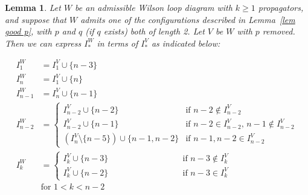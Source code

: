 \documentclass[11pt]{article}
\newtheorem{lem}[thm]{Lemma}
\theoremstyle{remark}
\theoremstyle{definition}
\begin{document}
\begin{lem}\label{lem I}
Let $W$ be an admissible Wilson loop diagram with $k\geq 1$ propagators, and suppose that $W$ admits one of the configurations described in Lemma~\ref{lem good p}, with $p$ and $q$ (if $q$ exists) both of length 2. Let $V$ be $W$ with $p$ removed.  Then we can express $I_*^W$ in terms of $I_*^V$ as indicated below:

  \begin{align*}
    I_1^{W} & = I_1^{V} \cup \{n-3\} \\
    I_n^{W} & = I_1^{V} \cup \{n\} \\
    I_{n-1}^{W} & = I_n^{V} \cup \{n-1\} \\
    I_{n-2}^{W} & =
    \begin{cases}
      I_{n-2}^{V}\cup \{n-2\} & \text{if $n-2\not\in I_{n-2}^{V}$} \\
      I_{n-2}^{V}\cup \{n-1\} & \text{if $n-2\in I_{n-2}^{V}$, $n-1\not\in I_{n-2}^{V}$} \\
      (I_{n}^{V} \setminus \{n-5\})\cup \{n-1,n-2\} & \text{if $n-1, n-2\in I_{n-2}^{V}$}
    \end{cases} \\
    I_{k}^{W} & =
    \begin{cases}
      I_k^{V}\cup \{n-3\} & \qquad \qquad \qquad \qquad \text{if $n-3 \not\in I_k^{V}$}\\
      I_k^{V}\cup\{n-2\} & \qquad \qquad \qquad \qquad \text{if $n-3\in I_k^{V}$}
    \end{cases} \\
    & \text{for $1<k<n-2$}
  \end{align*}
\end{lem}
\end{document}
